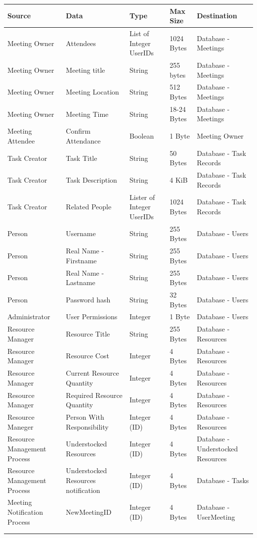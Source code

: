 \begin{table}[]
\centering
\label{my-label}
\begin{tabular}{|l|l|l|l|l|}
\hline
Source & Data & Type & Max Size & Destination \\ \hline
Meeting Owner & Attendees & List of Integer UserIDs & 1024 Bytes & Database - Meetings \\ \hline
Meeting Owner & Meeting title & String & 255 bytes & Database - Meetings \\ \hline
Meeting Owner & Meeting Location & String & 512 Bytes & Database - Meetings \\ \hline
Meeting Owner & Meeting Time & String & 18-24 Bytes & Database - Meetings \\ \hline
Meeting Attendee & Confirm Attendance & Boolean & 1 Byte & Meeting Owner \\ \hline
Task Creator & Task Title & String & 50 Bytes & Database - Task Records \\ \hline
Task Creator & Task Description & String & 4 KiB & Database - Task Records \\ \hline
Task Creator & Related People & Lister of Integer UserIDs & 1024 Bytes & Database - Task Records \\ \hline
Person & Username & String & 255 Bytes & Database - Users \\ \hline
Person & Real Name - Firstname & String & 255 Bytes & Database - Users \\ \hline
Person & Real Name - Lastname & String & 255 Bytes & Database - Users \\ \hline
Person & Password hash & String & 32 Bytes & Database - Users \\ \hline
Administrator & User Permissions & Integer & 1 Byte & Database - Users \\ \hline
Resource Manager & Resource Title & String & 255 Bytes & Database - Resources \\ \hline
Resource Manager & Resource Cost & Integer & 4 Bytes & Database - Resources \\ \hline
Resource Manager & Current Resource Quantity & Integer & 4 Bytes & Database - Resources \\ \hline
Resource Manager & Required Resource Quantity & Integer & 4  Bytes & Database - Resources \\ \hline
Resource Maneger & Person With Responsibility & Integer (ID) & 4 Bytes & Database - Resources \\ \hline
Resource Management Process & Understocked Resources & Integer (ID) & 4 Bytes & Database - Understocked Resources \\ \hline
Resource Management Process & Understocked Resources notification & Integer (ID) & 4 Bytes & Database - Tasks \\ \hline
Meeting Notification Process & NewMeetingID & Integer (ID) & 4 Bytes & Database - UserMeeting \\ \hline
 &  &  &  &  \\ \hline
 &  &  &  &  \\ \hline
\end{tabular}
\end{table}

